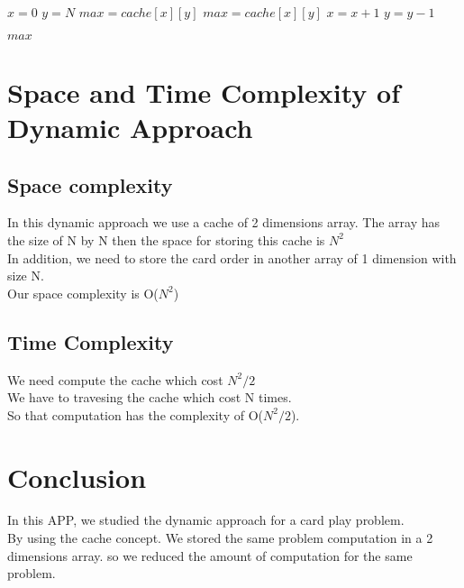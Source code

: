 \documentclass{article}
\begin{document}
\begin{algorithm}[H]
\begin{algorithmic}
\caption{}
\State $x = 0$	
\State $y = N$	
\State $max = cache[x][y]$
		\State $max = cache[x][y]$	
	\EndIf
	\State $x = x + 1$
	\State $y = y - 1$	
\EndFor

\Return $max$
\EndProcedure
\end{algorithmic}
\end{algorithm}


\section{Space and Time Complexity of Dynamic Approach}
\subsection{Space complexity}
In this dynamic approach we use a cache of 2 dimensions array. The array has the size of N by N then the space for storing this cache is $N^{2}$
\\[0.3cm]
In addition, we need to store the card order in another array of 1 dimension with size N.
\\[0.3cm]
Our space complexity is O($N^{2 }$)

\subsection{Time Complexity}

We need compute the cache which cost $N^{2}/2$
\\[0.3cm]
We have to travesing the cache which cost N times.
\\[0.3cm]
So that computation has the complexity of O($N^{2}/2$).


\section{Conclusion}
In this APP, we studied the dynamic approach for a card play problem.
\\[0.5cm]
By using the cache concept. We stored the same problem computation in a 2 dimensions array. so we reduced the amount of computation for the same problem.
\end{document}
